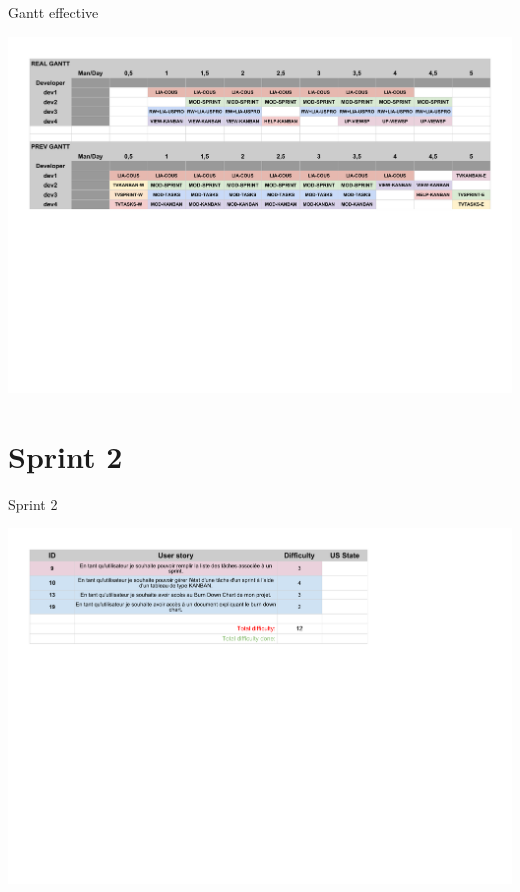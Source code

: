 \documentclass{beamer}
\begin{document}
\begin{frame}{Gantt effective}
	\begin{center}
        \includegraphics[scale=0.41]{Gantt3real.pdf}
        \end{center}
\end{frame}

\section{Sprint 2}

\begin{frame}{Sprint 2}
	\begin{center}
        \includegraphics[scale=0.55]{Sprint4.pdf}
        \end{center}
\end{frame}
\end{document}
